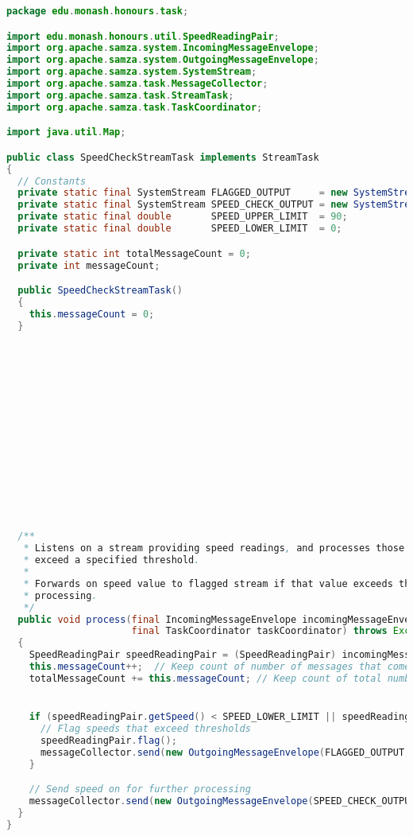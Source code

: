 \clearpage
\begin{lstlisting}[language=java,caption=edu.monash.honours.task.SpeedCheckStreamTask (Java)]
package edu.monash.honours.task;

import edu.monash.honours.util.SpeedReadingPair;
import org.apache.samza.system.IncomingMessageEnvelope;
import org.apache.samza.system.OutgoingMessageEnvelope;
import org.apache.samza.system.SystemStream;
import org.apache.samza.task.MessageCollector;
import org.apache.samza.task.StreamTask;
import org.apache.samza.task.TaskCoordinator;

import java.util.Map;

public class SpeedCheckStreamTask implements StreamTask
{
  // Constants
  private static final SystemStream FLAGGED_OUTPUT     = new SystemStream("kafka", "flagged-output");
  private static final SystemStream SPEED_CHECK_OUTPUT = new SystemStream("kafka", "speed-check-output");
  private static final double       SPEED_UPPER_LIMIT  = 90;
  private static final double       SPEED_LOWER_LIMIT  = 0;

  private static int totalMessageCount = 0;
  private int messageCount;

  public SpeedCheckStreamTask()
  {
    this.messageCount = 0;
  }















  /**
   * Listens on a stream providing speed readings, and processes those speed readings depending on whether or not they
   * exceed a specified threshold.
   *
   * Forwards on speed value to flagged stream if that value exceeds thresholds, else forwards on speed for further
   * processing.
   */
  public void process(final IncomingMessageEnvelope incomingMessageEnvelope, final MessageCollector messageCollector,
                      final TaskCoordinator taskCoordinator) throws Exception
  {
    SpeedReadingPair speedReadingPair = (SpeedReadingPair) incomingMessageEnvelope.getMessage();
    this.messageCount++;  // Keep count of number of messages that come through here
    totalMessageCount += this.messageCount; // Keep count of total number of messages received on this stream.


    if (speedReadingPair.getSpeed() < SPEED_LOWER_LIMIT || speedReadingPair.getSpeed() > SPEED_UPPER_LIMIT) {
      // Flag speeds that exceed thresholds
      speedReadingPair.flag();
      messageCollector.send(new OutgoingMessageEnvelope(FLAGGED_OUTPUT, speedReadingPair));
    }

    // Send speed on for further processing
    messageCollector.send(new OutgoingMessageEnvelope(SPEED_CHECK_OUTPUT, speedReadingPair));
  }
}
\end{lstlisting}

